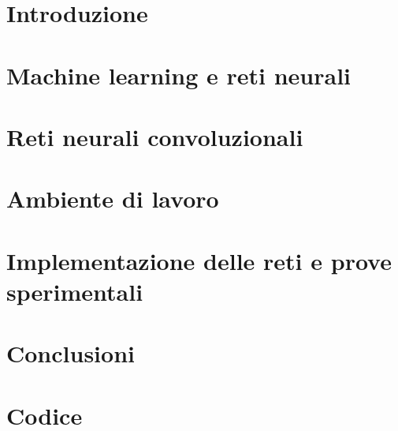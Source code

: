 \documentclass[12pt,a4paper]{report}
\begin{document}

 
\chapter{Introduzione}




\chapter{Machine learning e reti neurali}



\chapter{Reti neurali convoluzionali}



\normalfont
\chapter{Ambiente di lavoro}




\chapter{Implementazione delle reti e prove sperimentali}




\chapter{Conclusioni}



\chapter{Codice}







\cleardoublepage{} %
\end{document}
